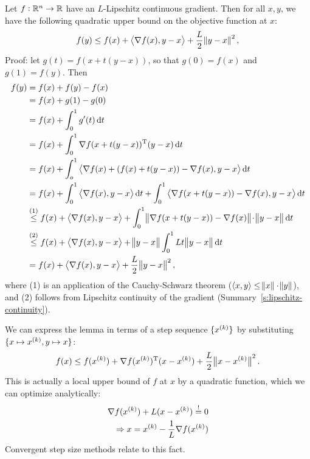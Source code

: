 \documentclass{article}
\begin{document}
\label{s:descent-lemma}

Let \(f: \mathbb{R}^n \to \mathbb{R}\) have an \(L\)-Lipschitz continuous gradient.  Then for all \(x, y\), we
have the following quadratic upper bound on the objective function at \(x\):
\begin{equation*}
  f(y) \leq f(x) + \iprod{\nabla f(x)}{y - x} + \frac{L}{2}\enVert{y - x}^2,
\end{equation*}
Proof: let \(g(t) = f(x + t(y - x))\), so that \(g(0) = f(x)\) and \(g(1) = f(y)\). Then
\begin{align*}
  f(y) &= f(x) + f(y) - f(x) \\
       &= f(x) + g(1) - g(0) \\
       &= f(x) + \int_0^1 g'(t) \dif t \\
       &= f(x) + \int_0^1 \T{\nabla f(x + t(y - x))} (y - x) \dif t \\
       &= f(x) + \int_o^1 \iprod{\nabla f(x) + (f(x) + t(y - x)) - \nabla f(x)}{y - x} \dif t \\
       &= f(x) + \int_0^1 \iprod{\nabla f(x)}{y - x} \dif t
         + \int_0^1 \iprod{\nabla f(x + t(y - x)) - \nabla f(x)}{y - x} \dif t \\
       &\overset{(1)}{\leq} f(x) + \iprod{\nabla f(x)}{y - x}
         + \int_0^1 \enVert[1]{\nabla f(x + t(y - x)) - \nabla f(x)}\! \cdot \enVert[1]{y - x} \dif t \\
       &\overset{(2)}{\leq} f(x) + \iprod{\nabla f(x)}{y - x} + \enVert[1]{y - x} \int_0^1 Lt\enVert[1]{y - x} \dif t \\
       &= f(x) + \iprod{\nabla f(x)}{y - x} + \frac{L}{2}\enVert[1]{y - x}^2,
\end{align*}
where (1) is an application of the Cauchy-Schwarz theorem
(\(\langle x, y \rangle \leq \enVert{x} \cdot \enVert{y}\)), and (2) follows from Lipschitz
continuity of the gradient (Summary~\ref{s:lipschitz-continuity}).


\label{s:descent-lemma-interpretation}

We can express the lemma in terms of a step sequence \(\{x^{(k)}\}\) by substituting
\(\{x \mapsto x^{(k)}, y \mapsto x\}\):
\begin{equation*}
  f(x) \leq f(\kth{x}) + \T{\nabla f(\kth{x})}(x - \kth{x}) + \frac{L}{2}\enVert[1]{x - \kth{x}}^2.
\end{equation*}
This is actually a local upper bound of \(f\) at \(x\) by a quadratic function, which we can
optimize analytically:
\begin{gather*}
  \nabla f(x^{(k)}) + L (x - x^{(k)}) \overset{!}{=} 0\\
  \quad \Rightarrow x = x^{(k)} - \frac{1}{L} \nabla f(x^{(k)})
\end{gather*}
Convergent step size methods relate to this fact.
\end{document}
